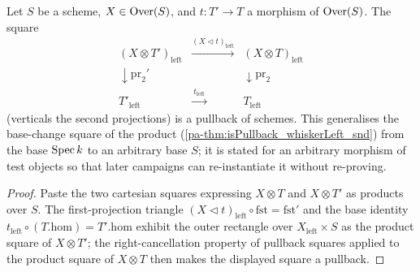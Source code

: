 \begin{theorem}
  \label{pa-thm:isPullback_whiskerLeft_left}
  \leanok

  Let \(S\) be a scheme, \(X \in \mathrm{Over}(S)\), and \(t : T' \to T\) a morphism of
  \(\mathrm{Over}(S)\). The square
  \[
    \begin{array}{ccc}
      (X \otimes T')_{\mathrm{left}} & \xrightarrow{(X \lhd t)_{\mathrm{left}}} &
        (X \otimes T)_{\mathrm{left}} \\
      \downarrow \mathrm{pr}_2' & & \downarrow \mathrm{pr}_2 \\
      T'_{\mathrm{left}} & \xrightarrow{\ t_{\mathrm{left}}\ } & T_{\mathrm{left}}
    \end{array}
  \]
  (verticals the second projections) is a pullback of schemes. This generalises the
  base-change square of the product (\ref{pa-thm:isPullback_whiskerLeft_snd}) from the base
  \(\operatorname{Spec} k\) to an arbitrary base \(S\); it is stated for an arbitrary morphism of test
  objects so that later campaigns can re-instantiate it without re-proving.
\end{theorem}
\begin{proof}
  \leanok
  Paste the two cartesian squares expressing \(X \otimes T\) and \(X \otimes T'\) as
  products over \(S\). The first-projection triangle
  \((X \lhd t)_{\mathrm{left}} \circ \mathrm{fst} = \mathrm{fst}'\) and the base identity
  \(t_{\mathrm{left}} \circ (T.\mathrm{hom}) = T'.\mathrm{hom}\) exhibit the outer
  rectangle over \(X_{\mathrm{left}} \times S\) as the product square of
  \(X \otimes T'\); the right-cancellation property of pullback squares applied to the
  product square of \(X \otimes T\) then makes the displayed square a pullback.
\end{proof}

